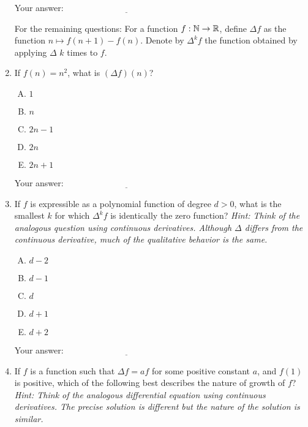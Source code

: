\documentclass[10pt]{amsart}
\begin{document}
\begin{enumerate}
  \vspace{0.1in}
  Your answer: $\underline{\qquad\qquad\qquad\qquad\qquad\qquad\qquad}$
  \vspace{0.15in}

  For the remaining questions: For a function $f:\mathbb{N} \to \mathbb{R}$, define
  $\Delta f$ as the function $n \mapsto f(n+1) -f(n)$. Denote by
  $\Delta^k f$ the function obtained by applying $\Delta$ $k$ times to
  $f$.
\item  If $f(n) = n^2$, what is $(\Delta f)(n)$?

  \begin{enumerate}[(A)]
  \item $1$
  \item $n$
  \item $2n - 1$
  \item $2n$
  \item $2n + 1$
  \end{enumerate}

  \vspace{0.1in}
  Your answer: $\underline{\qquad\qquad\qquad\qquad\qquad\qquad\qquad}$
  \vspace{0.15in}

\item If $f$ is expressible as a polynomial function of degree $d >
  0$, what is the smallest $k$ for which $\Delta^k f$ is identically
  the zero function? {\em Hint: Think of the analogous question using
  continuous derivatives. Although $\Delta$ differs from the
  continuous derivative, much of the qualitative behavior is the same.}

  \begin{enumerate}[(A)]
  \item $d - 2$
  \item $d - 1$
  \item $d$
  \item $d + 1$
  \item $d + 2$
  \end{enumerate}

  \vspace{0.1in}
  Your answer: $\underline{\qquad\qquad\qquad\qquad\qquad\qquad\qquad}$
  \vspace{0.15in}

\item If $f$ is a function such that $\Delta f = af$ for some positive
  constant $a$, and $f(1)$ is positive, which of the following best
  describes the nature of growth of $f$? {\em Hint: Think of the
  analogous differential equation using continuous derivatives. The
  precise solution is different but the nature of the solution is
  similar.}


\end{enumerate}
\end{document}
